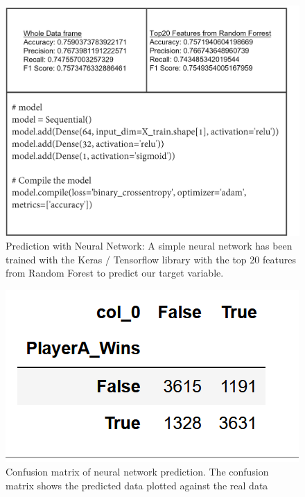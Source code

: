 %
\begin{figure}[h]
\includegraphics[width=\textwidth]{pictures/nn_model.png}
\caption{Prediction with Neural Network: A simple neural network has been trained with the Keras / Tensorflow library with the top 20 features from Random Forest to predict our target variable.}
\label{nn_moodel}
\end{figure}
%

%
\begin{figure}[h]
\includegraphics[width=\textwidth]{pictures/confusion_matrix_nn.png}
\caption{Confusion matrix of neural network prediction. The confusion matrix shows the predicted data plotted against the real data}
\label{confusion_matrix_nn}
\end{figure}
%

